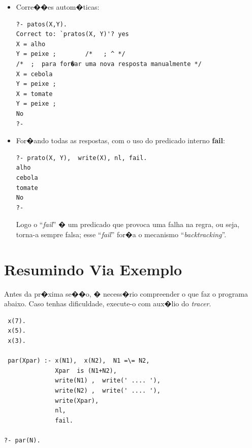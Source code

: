\documentclass[final,a4paper]{article}
\begin{document}
\begin{itemize}
\setlength{\itemsep}{-5pt}
\item Corre��es autom�ticas:
{\small
\begin{verbatim}
?- patos(X,Y).
Correct to: `pratos(X, Y)'? yes
X = alho
Y = peixe ;        /*   ; ^ */
/*  ;  para for�ar uma nova resposta manualmente */
X = cebola
Y = peixe ;
X = tomate
Y = peixe ;
No
?-
\end{verbatim}
}
\item For�ando todas as respostas, com o uso do
predicado interno {\bf fail}:
{\small
\begin{verbatim}
?- prato(X, Y),  write(X), nl, fail.
alho
cebola
tomate
No
?-
\end{verbatim}
}

 Logo o ``{\em fail}'' � um predicado que
 provoca uma falha na regra, ou seja, torna-a
  sempre falsa; esse  ``{\em fail}''
  for�a o mecanismo ``{\em backtracking}''.

\end{itemize}


\section{Resumindo Via Exemplo}
Antes da pr�xima se��o, � necess�rio compreender o que faz o programa abaixo. Caso tenhas dificuldade, execute-o com aux�lio do {\em tracer}.


\begin{lstlisting}
 x(7).
 x(5).
 x(3).

 par(Xpar) :- x(N1),  x(N2),  N1 =\= N2,  
              Xpar  is (N1+N2),
              write(N1) ,  write(' .... '),   
              write(N2) ,  write(' .... '),  
              write(Xpar),
              nl,   
              fail.

?- par(N).
\end{lstlisting}
\end{document}
